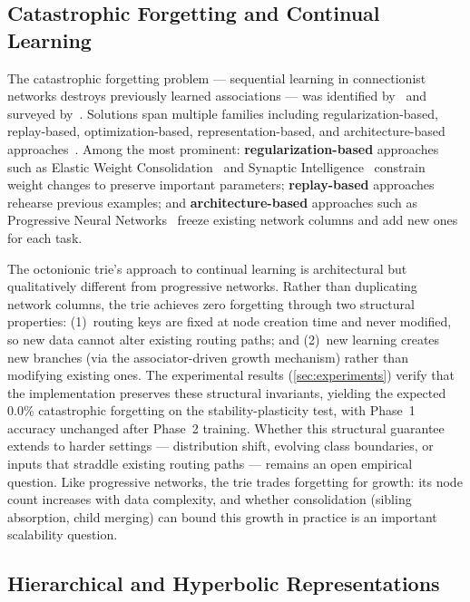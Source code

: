 \documentclass[11pt,a4paper]{article}
\theoremstyle{definition}
\theoremstyle{remark}
\begin{document}
\subsection{Catastrophic Forgetting and Continual Learning}

The catastrophic forgetting problem --- sequential learning in connectionist networks destroys previously learned associations --- was identified by~\citet{McCloskey1989} and surveyed by~\citet{French1999}. Solutions span multiple families including regularization-based, replay-based, optimization-based, representation-based, and architecture-based approaches~\citep{Wang2024}. Among the most prominent: \textbf{regularization-based} approaches such as Elastic Weight Consolidation~\citep{Kirkpatrick2017} and Synaptic Intelligence~\citep{Zenke2017} constrain weight changes to preserve important parameters; \textbf{replay-based} approaches rehearse previous examples; and \textbf{architecture-based} approaches such as Progressive Neural Networks~\citep{Rusu2016} freeze existing network columns and add new ones for each task.

The octonionic trie's approach to continual learning is architectural but qualitatively different from progressive networks. Rather than duplicating network columns, the trie achieves zero forgetting through two structural properties: (1)~routing keys are fixed at node creation time and never modified, so new data cannot alter existing routing paths; and (2)~new learning creates new branches (via the associator-driven growth mechanism) rather than modifying existing ones. The experimental results (\cref{sec:experiments}) verify that the implementation preserves these structural invariants, yielding the expected 0.0\% catastrophic forgetting on the stability-plasticity test, with Phase~1 accuracy unchanged after Phase~2 training. Whether this structural guarantee extends to harder settings --- distribution shift, evolving class boundaries, or inputs that straddle existing routing paths --- remains an open empirical question. Like progressive networks, the trie trades forgetting for growth: its node count increases with data complexity, and whether consolidation (sibling absorption, child merging) can bound this growth in practice is an important scalability question.

\subsection{Hierarchical and Hyperbolic Representations}
\end{document}

